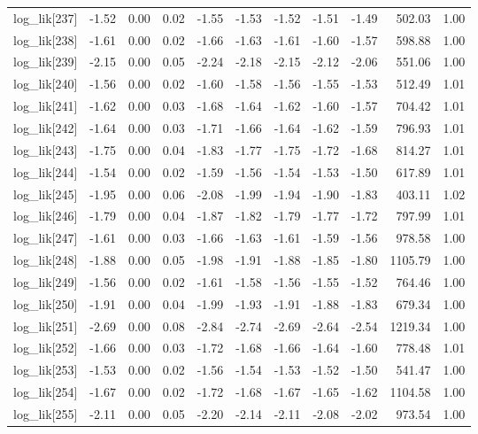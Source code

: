\begin{table}[ht]
\begin{tabular}{rrrrrrrrrrr}
  log\_lik[237] & -1.52 & 0.00 & 0.02 & -1.55 & -1.53 & -1.52 & -1.51 & -1.49 & 502.03 & 1.00 \\ 
  log\_lik[238] & -1.61 & 0.00 & 0.02 & -1.66 & -1.63 & -1.61 & -1.60 & -1.57 & 598.88 & 1.00 \\ 
  log\_lik[239] & -2.15 & 0.00 & 0.05 & -2.24 & -2.18 & -2.15 & -2.12 & -2.06 & 551.06 & 1.00 \\ 
  log\_lik[240] & -1.56 & 0.00 & 0.02 & -1.60 & -1.58 & -1.56 & -1.55 & -1.53 & 512.49 & 1.01 \\ 
  log\_lik[241] & -1.62 & 0.00 & 0.03 & -1.68 & -1.64 & -1.62 & -1.60 & -1.57 & 704.42 & 1.01 \\ 
  log\_lik[242] & -1.64 & 0.00 & 0.03 & -1.71 & -1.66 & -1.64 & -1.62 & -1.59 & 796.93 & 1.01 \\ 
  log\_lik[243] & -1.75 & 0.00 & 0.04 & -1.83 & -1.77 & -1.75 & -1.72 & -1.68 & 814.27 & 1.01 \\ 
  log\_lik[244] & -1.54 & 0.00 & 0.02 & -1.59 & -1.56 & -1.54 & -1.53 & -1.50 & 617.89 & 1.01 \\ 
  log\_lik[245] & -1.95 & 0.00 & 0.06 & -2.08 & -1.99 & -1.94 & -1.90 & -1.83 & 403.11 & 1.02 \\ 
  log\_lik[246] & -1.79 & 0.00 & 0.04 & -1.87 & -1.82 & -1.79 & -1.77 & -1.72 & 797.99 & 1.01 \\ 
  log\_lik[247] & -1.61 & 0.00 & 0.03 & -1.66 & -1.63 & -1.61 & -1.59 & -1.56 & 978.58 & 1.00 \\ 
  log\_lik[248] & -1.88 & 0.00 & 0.05 & -1.98 & -1.91 & -1.88 & -1.85 & -1.80 & 1105.79 & 1.00 \\ 
  log\_lik[249] & -1.56 & 0.00 & 0.02 & -1.61 & -1.58 & -1.56 & -1.55 & -1.52 & 764.46 & 1.00 \\ 
  log\_lik[250] & -1.91 & 0.00 & 0.04 & -1.99 & -1.93 & -1.91 & -1.88 & -1.83 & 679.34 & 1.00 \\ 
  log\_lik[251] & -2.69 & 0.00 & 0.08 & -2.84 & -2.74 & -2.69 & -2.64 & -2.54 & 1219.34 & 1.00 \\ 
  log\_lik[252] & -1.66 & 0.00 & 0.03 & -1.72 & -1.68 & -1.66 & -1.64 & -1.60 & 778.48 & 1.01 \\ 
  log\_lik[253] & -1.53 & 0.00 & 0.02 & -1.56 & -1.54 & -1.53 & -1.52 & -1.50 & 541.47 & 1.00 \\ 
  log\_lik[254] & -1.67 & 0.00 & 0.02 & -1.72 & -1.68 & -1.67 & -1.65 & -1.62 & 1104.58 & 1.00 \\ 
  log\_lik[255] & -2.11 & 0.00 & 0.05 & -2.20 & -2.14 & -2.11 & -2.08 & -2.02 & 973.54 & 1.00 \\ 

\end{tabular}
\end{table}

